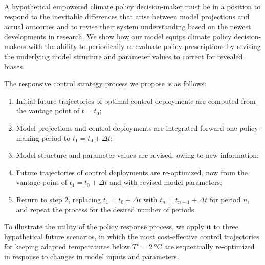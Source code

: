 \documentclass{article}
\begin{document}

A hypothetical empowered climate policy decision-maker must be in a position to respond to the inevitable differences that arise between model projections and actual outcomes and to revise their system understanding based on the newest developments in research. We show how our model equips climate policy decision-makers with the ability to periodically re-evaluate policy prescriptions by revising the underlying model structure and parameter values to correct for revealed biases.

The responsive control strategy process we propose is as follows:
\begin{enumerate}
    \item Initial future trajectories of optimal control deployments are computed from the vantage point of $t=t_{0}$;
    \item Model projections and control deployments are integrated forward one policy-making period to $t_{1}=t_{0} + \Delta t$;
    \item Model structure and parameter values are revised, owing to new information;
    \item Future trajectories of control deployments are re-optimized, now from the vantage point of $t_{1}=t_{0}+\Delta t$ and with revised model parameters;
    \item Return to step 2, replacing $t_{1} = t_{0} + \Delta t$ with $t_{n} = t_{n-1}+\Delta t$ for period $n$, and repeat the process for the desired number of periods.
\end{enumerate}

To illustrate the utility of the policy response process, we apply it to three hypothetical future scenarios, in which the most cost-effective control trajectories for keeping adapted temperatures below $T^{\star} = \SI{2}{\celsius}$ are sequentially re-optimized in response to changes in model inputs and parameters.

\end{document}
